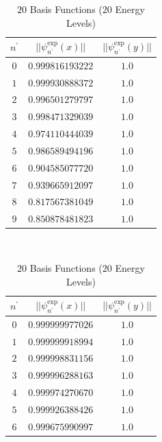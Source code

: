 \documentclass[../main.tex]{subfiles}
\begin{document}
\begin{table}[!ht]
  \centering
  \begin{subtable}{.4\linewidth}
      \centering
      \begin{tabular}{ | c | c | c | }
        \hline
        $n^\prime$ & $||\psi_{n^\prime}^\textrm{exp}(x)||$ & $||\psi_{n^\prime}^\textrm{exp}(y)||$\\*
        \hline
        $0$ & $0.999816193222$ & $1.0$\\*
        \hline
        $1$ & $0.999930888372$ & $1.0$\\*
        \hline
        $2$ & $0.996501279797$ & $1.0$\\*
        \hline
        $3$ & $0.998471329039$ & $1.0$\\*
        \hline
        $4$ & $0.974110444039$ & $1.0$\\*
        \hline
        $5$ & $0.986589494196$ & $1.0$\\*
        \hline
        $6$ & $0.904585077720$ & $1.0$\\*
        \hline
        $7$ & $0.939665912097$ & $1.0$\\*
        \hline
        $8$ & $0.817567381049$ & $1.0$\\*
        \hline
        $9$ & $0.850878481823$ & $1.0$\\*
        \hline
      \end{tabular}
      \caption{$20$ Basis Functions ($20$ Energy Levels)}
      \label{tab:NormE20}
  \end{subtable}
  ~
  \begin{subtable}{.4\linewidth}
    \centering
    \begin{tabular}{ | c | c | c | }
        \hline
        $n^\prime$ & $||\psi_{n^\prime}^\textrm{exp}(x)||$ & $||\psi_{n^\prime}^\textrm{exp}(y)||$\\*
        \hline
        $0$ & $0.999999977026$ & $1.0$\\*
        \hline
        $1$ & $0.999999918994$ & $1.0$\\*
        \hline
        $2$ & $0.999998831156$ & $1.0$\\*
        \hline
        $3$ & $0.999996288163$ & $1.0$\\*
        \hline
        $4$ & $0.999974270670$ & $1.0$\\*
        \hline
        $5$ & $0.999926388426$ & $1.0$\\*
        \hline
        $6$ & $0.999675990997$ & $1.0$\\*
        \hline

\end{tabular}
\end{subtable}
\end{table}
\end{document}
